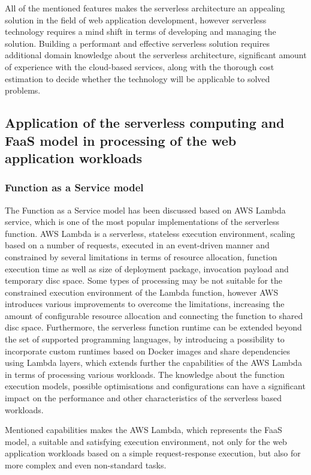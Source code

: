 All of the mentioned features makes the serverless architecture an appealing solution in the field of web application development, however serverless technology requires a mind shift in terms of developing and managing the solution.
Building a performant and effective serverless solution requires additional domain knowledge about the serverless architecture, significant amount of experience with the cloud-based services, along with the thorough cost estimation to decide whether the technology will be applicable to solved problems.

\subsection{Application of the serverless computing and FaaS model in processing of the web application workloads}

\subsubsection{Function as a Service model}

The Function as a Service model has been discussed based on AWS Lambda service, which is one of the most popular implementations of the serverless function. 
AWS Lambda is a serverless, stateless execution environment, scaling based on a number of requests, executed in an event-driven manner and constrained by several limitations in terms of resource allocation, function execution time as well as size of deployment package, invocation payload and temporary disc space.
Some types of processing may be not suitable for the constrained execution environment of the Lambda function, however AWS introduces various improvements to overcome the limitations, increasing the amount of configurable resource allocation and connecting the function to shared disc space.
Furthermore, the serverless function runtime can be extended beyond the set of supported programming languages, by introducing a possibility to incorporate custom runtimes based on Docker images and share dependencies using Lambda layers, which extends further the capabilities of the AWS Lambda in terms of processing various workloads.
The knowledge about the function execution models, possible optimisations and configurations can have a significant impact on the performance and other characteristics of the serverless based workloads.

Mentioned capabilities makes the AWS Lambda, which represents the FaaS model, a suitable and satisfying execution environment, not only for the web application workloads based on a simple request-response execution, but also for more complex and even non-standard tasks.

